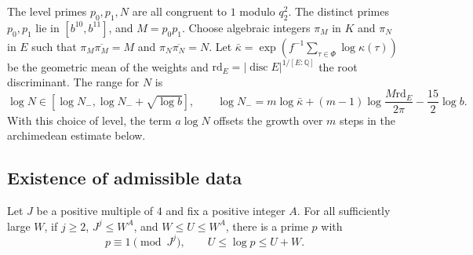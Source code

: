 The level primes \(p_0,p_1,N\) are all congruent to \(1\) modulo \(q_2^2\).
The distinct primes \(p_0,p_1\) lie in \([b^{10},b^{11}]\), and \(M=p_0p_1\).
Choose algebraic integers \(\pi_M\) in \(K\) and \(\pi_N\) in \(E\) such that
\(\pi_M\overline{\pi_M}=M\) and \(\pi_N\overline{\pi_N}=N\).
Let \(\bar\kappa=\exp(f^{-1}\sum_{\tau\in\Phi}\log\kappa(\tau))\) be the
geometric mean of the weights and
\(\mathrm{rd}_E=|\operatorname{disc} E|^{1/[E:\mathbb Q]}\) the root discriminant.
The range for \(N\) is
\begin{equation}\label{eq:level-window}
 \log N\in[\log N_-,\log N_-+\sqrt{\log b}],\qquad
 \log N_-=
 m\log\bar\kappa+(m-1)\log\frac{M\mathrm{rd}_E}{2\pi}
 -\frac{15}{2}\log b.
\end{equation}
With this choice of level, the term \(a\log N\) offsets the growth over \(m\)
steps in the archimedean estimate below.

\subsection{Existence of admissible data}

\begin{lemma}\label{lem:log-window-prime}
Let \(J\) be a positive multiple of \(4\) and fix a positive integer \(A\).
For all sufficiently large \(W\), if \(j\ge2\), \(J^j\le W^A\), and
\(W\le U\le W^A\), there is a prime \(p\) with
\[
 p\equiv1\pmod{J^j},\qquad U\le\log p\le U+W .
\]
\end{lemma}

